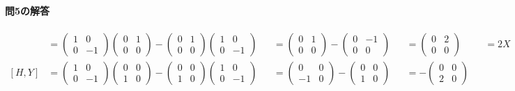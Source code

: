 \paragraph{問5の解答}
\begin{align*}
[H, X]
&=
\begin{pmatrix}
1 & 0 \\
0 & -1
\end{pmatrix}
\begin{pmatrix}
0 & 1 \\
0 & 0
\end{pmatrix}
-
\begin{pmatrix}
0 & 1 \\
0 & 0
\end{pmatrix}
\begin{pmatrix}
1 & 0 \\
0 & -1
\end{pmatrix}
 & &=
\begin{pmatrix}
0 & 1 \\
0 & 0
\end{pmatrix}
-
\begin{pmatrix}
0 & -1 \\
0 & 0
\end{pmatrix}
& &= 
\begin{pmatrix}
0 & 2 \\
0 & 0
\end{pmatrix}
& &= 2X \\
[H, Y]
&=
\begin{pmatrix}
1 & 0 \\
0 & -1
\end{pmatrix}
\begin{pmatrix}
0 & 0 \\
1 & 0
\end{pmatrix}
-
\begin{pmatrix}
0 & 0 \\
1 & 0
\end{pmatrix}
\begin{pmatrix}
1 & 0 \\
0 & -1
\end{pmatrix}
& &=
\begin{pmatrix}
0 & 0 \\
-1 & 0
\end{pmatrix}
-
\begin{pmatrix}
0 & 0 \\
1 & 0
\end{pmatrix}
& &= -
\begin{pmatrix}
0 & 0 \\
2 & 0

\end{pmatrix}
\end{align*}
